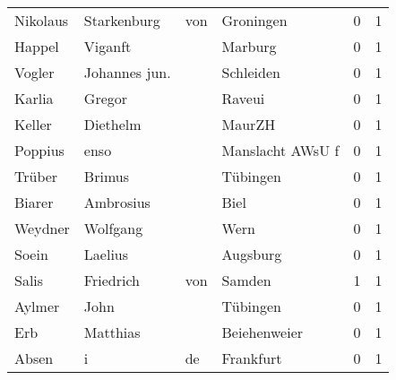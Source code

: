 \documentclass[10pt,a4paper,landscape]{article}
\begin{document}
\begin{longtable}{llllrr}
                 Nikolaus &                        Starkenburg &         von &                                   Groningen &          0 &         1 \\
                   Happel &                            Viganft &             &                                     Marburg &          0 &         1 \\
                   Vogler &                      Johannes jun. &             &                                   Schleiden &          0 &         1 \\
                   Karlia &                             Gregor &             &                                      Raveui &          0 &         1 \\
                   Keller &                           Diethelm &             &                                      MaurZH &          0 &         1 \\
                  Poppius &                               enso &             &                            Manslacht AWsU f &          0 &         1 \\
                   Trüber &                             Brimus &             &                                    Tübingen &          0 &         1 \\
                   Biarer &                          Ambrosius &             &                                        Biel &          0 &         1 \\
                  Weydner &                           Wolfgang &             &                                        Wern &          0 &         1 \\
                    Soein &                            Laelius &             &                                    Augsburg &          0 &         1 \\
                    Salis &                          Friedrich &         von &                                      Samden &          1 &         1 \\
                   Aylmer &                               John &             &                                    Tübingen &          0 &         1 \\
                      Erb &                           Matthias &             &                                Beiehenweier &          0 &         1 \\
                    Absen &                                  i &          de &                                   Frankfurt &          0 &         1 \\

\end{longtable}
\end{document}
